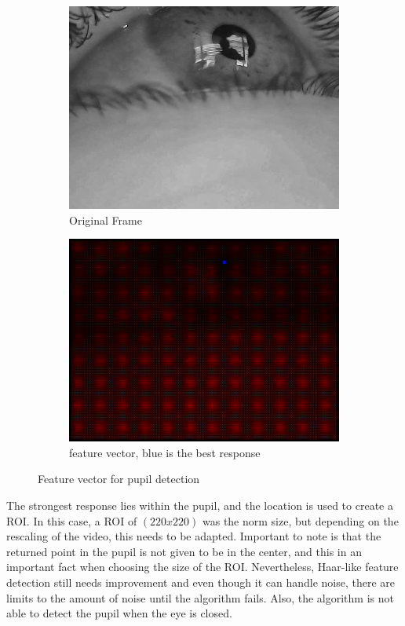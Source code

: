 \begin{figure}[h]
    \centering
    \begin{subfigure}{0.5\textwidth}
        \centering
        \includegraphics[width=0.9\linewidth]{plots/results/originalbest.png}
        \caption{Original Frame}
    \end{subfigure}%
    \hfill
    \begin{subfigure}{0.5\textwidth}
        \centering
        \includegraphics[width=0.9\linewidth]{plots/results/responsehaarbest.png}
        \caption{feature vector, blue is the best response}
    \end{subfigure}%
 
    \caption{Feature vector for pupil detection}
    \label{fig:limit_haar}
\end{figure}

The strongest response lies within the pupil, and the location is used to create a ROI. In this case, a ROI of $(220 x 220)$ was the norm size, but depending on the rescaling of the video, this needs to be adapted. Important to note is that the returned point in the pupil is not given to be in the center, and this in an important fact when choosing the size of the ROI.
Nevertheless, Haar-like feature detection still needs improvement and even though it can handle noise, there are limits to the amount of noise until the algorithm fails. Also, the algorithm is not able to detect the pupil when the eye is closed.

